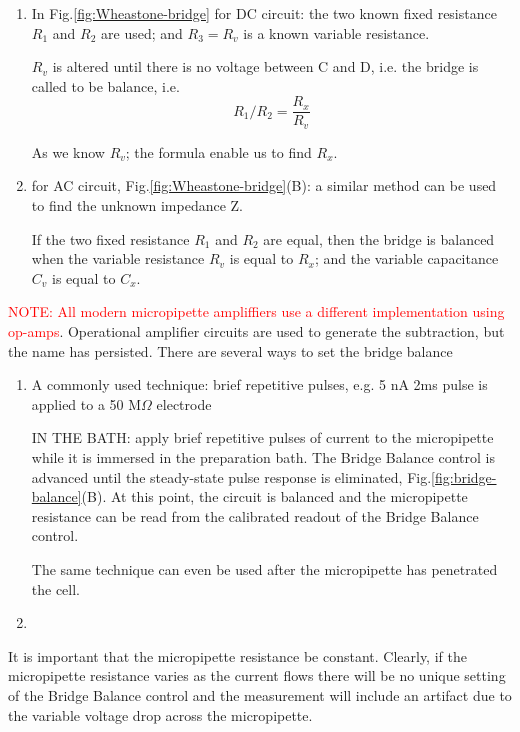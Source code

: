 \begin{enumerate}
  
  \item In Fig.\ref{fig:Wheastone-bridge} for DC circuit: 
  the two known fixed resistance $R_1$ and $R_2$ are used; and $R_3=R_v$ is a
  known variable resistance.
  
  $R_v$ is altered until there is no voltage between C and D, i.e. the bridge
  is called to be balance, i.e. 
  \begin{equation}
  R_1/R_2 = \frac{R_x}{R_v}
  \end{equation} 

As we know $R_v$; the formula enable us to find $R_x$.

  \item for AC circuit, Fig.\ref{fig:Wheastone-bridge}(B): a similar method can
  be used to find the unknown impedance Z.
  
  If the two fixed resistance $R_1$ and $R_2$ are equal, then the bridge is
  balanced when the variable resistance $R_v$ is equal to $R_x$; and the
  variable capacitance $C_v$ is equal to $C_x$.
  
\end{enumerate}

\textcolor{red}{NOTE: All modern micropipette ampliffiers use a different
implementation using op-amps}. Operational amplifier circuits are used to
generate the subtraction, but the name has persisted. There are several ways to
set the bridge balance
\begin{enumerate}
  \item A commonly used technique: brief repetitive pulses, e.g. 5 nA 2ms pulse
  is applied to a 50 M$\Omega$ electrode

IN THE BATH: apply brief repetitive pulses of current to the micropipette while
it is immersed in the preparation bath. The Bridge Balance control is advanced
until the steady-state pulse response is eliminated,
Fig.\ref{fig:bridge-balance}(B). At this point, the circuit is balanced and the
micropipette resistance can be read from the calibrated readout of the Bridge
Balance control.

The same technique can even be used after the micropipette has penetrated the
cell.

  \item
\end{enumerate}
It is important that the micropipette resistance be constant. Clearly, if the micropipette
resistance varies as the current flows there will be no unique setting of the Bridge Balance
control and the measurement will include an artifact due to the variable voltage drop
across the micropipette.

